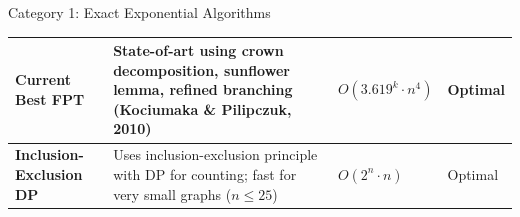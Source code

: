 \documentclass[aspectratio=169]{beamer}
\begin{document}
\begin{frame}{Category 1: Exact Exponential Algorithms}
\begin{table}
\begin{tabular}{@{}p{3.2cm}p{5cm}p{2.5cm}p{2cm}@{}}
			\textbf{Current Best FPT}                                                                                    &
			State-of-art using crown decomposition, sunflower lemma, refined branching (Kociumaka \& Pilipczuk, 2010)    &
			$O(3.619^k \cdot n^4)$                                                                                       &
			Optimal                                                                                                                                                                               \\
			\midrule

			\textbf{Inclusion-Exclusion DP}                                                                              &
			Uses inclusion-exclusion principle with DP for counting; fast for very small graphs ($n \leq 25$)            &
			$O(2^n \cdot n)$                                                                                             &
			Optimal                                                                                                                                                                               \\

			\bottomrule
		\end{tabular}
	\end{table}

\end{frame}

\end{document}
